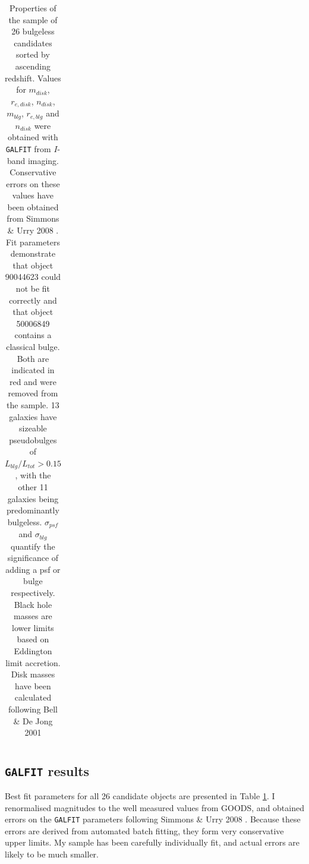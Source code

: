 \documentclass[11pt,twocolumn]{article}
\begin{document}
\begin{table}[!t]
\begin{tabular}{@{}rrrrrrrccrr@{}}
\bottomrule
\end{tabular}
\caption{Properties of the sample of 26 bulgeless candidates sorted by ascending redshift. Values for $m_{disk}$, $r_{e,disk}$, $n_{disk}$, $m_{blg}$, $r_{e,blg}$ and $n_{disk}$ were obtained with {\tt GALFIT} from $I$-band imaging. Conservative errors on these values have been obtained from Simmons \& Urry 2008 \cite{2008ApJ...683..644S}.  Fit parameters demonstrate that object 90044623 could not be fit correctly and that object 50006849 contains a classical bulge. Both are indicated in red and were removed from the sample. 13 galaxies have sizeable pseudobulges of $L_{blg}/L_{tot} > 0.15$, with the other 11 galaxies being predominantly bulgeless. $\sigma_{psf}$ and $\sigma_{blg}$ quantify the significance of adding a psf or bulge respectively. Black hole masses are lower limits based on Eddington limit accretion. Disk masses have been calculated following Bell \& De Jong 2001 \cite{2001ApJ...550..212B}}\label{resulttable}
\end{table}
\subsection{ {\tt GALFIT} results}
Best fit parameters for all 26 candidate objects are presented in Table \ref{resulttable}. I renormalised magnitudes to the well measured values from GOODS\cite{2012ApJS..200....9G}, and obtained errors on the {\tt GALFIT} parameters following Simmons \& Urry 2008 \cite{2008ApJ...683..644S}. Because these errors are derived from automated batch fitting, they form very conservative upper limits. My sample has been carefully individually fit,  and actual errors are likely to be much smaller. 
\end{document}
